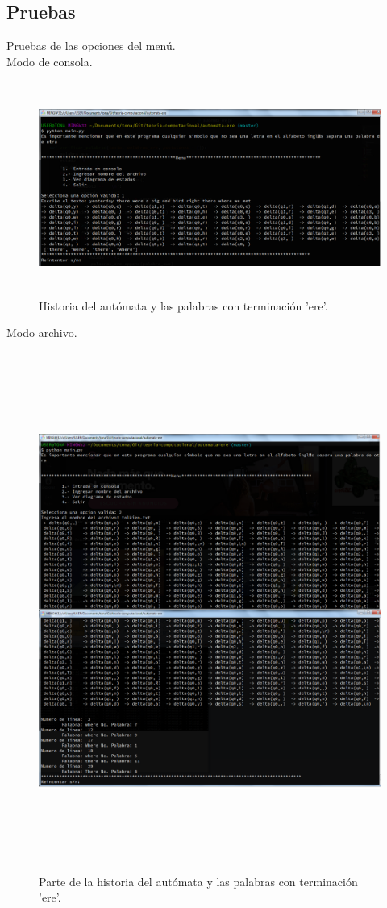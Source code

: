 	\subsection{Pruebas}
	Pruebas de las opciones del menú.
	\\
	{\large Modo de consola.}
	\begin{figure}[H]
		\begin{center}
			\includegraphics[width=\linewidth, height=7cm]{img/ere-manual.png}
			\caption{Historia del autómata y las palabras con terminación 'ere'.}
			\label{fig:ere1}
		\end{center}
	\end{figure}
	{\large Modo archivo.}
	\begin{figure}[H]
		\begin{center}
			\includegraphics[width=\linewidth, height=17cm]{img/ere-automatico.png}
			\caption{Parte de la historia del autómata y las palabras con terminación 'ere'.}
			\label{fig:ere2}
		\end{center}
	\end{figure}
